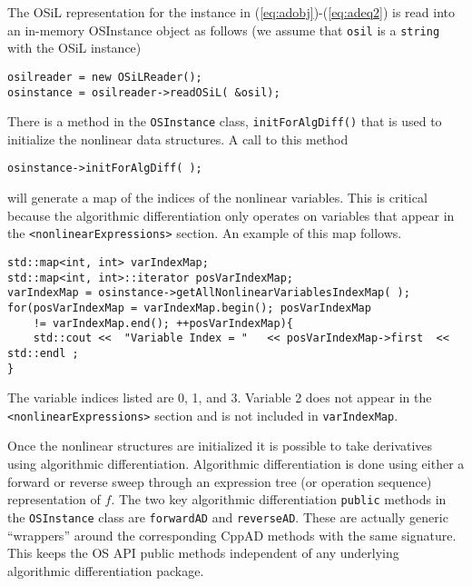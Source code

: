 \documentclass[11pt]{article}
\renewcommand{\_}{{\char"5F}}
\renewcommand{\{}{{\char"7B}}
\renewcommand{\}}{{\char"7D}}
\renewcommand{\^}{{\char"0D}}
\renewcommand{\'}{{\char"0D}}
\begin{document}
The OSiL representation for the instance  in  (\ref{eq:adobj})-(\ref{eq:adeq2})  is read into an in-memory OSInstance object as follows (we assume that {\tt osil} is a {\tt string} with the OSiL instance)
\begin{verbatim}
osilreader = new OSiLReader();
osinstance = osilreader->readOSiL( &osil);
\end{verbatim}
There is a method in the {\tt OSInstance} class, {\tt initForAlgDiff()} that is used to initialize the nonlinear data structures.  A call to this method
\begin{verbatim}
osinstance->initForAlgDiff( );
\end{verbatim}
will generate a map of the indices of the nonlinear variables. This is critical because the algorithmic differentiation only operates on variables that appear in the {\tt <nonlinearExpressions>} section.  An example of this map follows.
\begin{verbatim}
std::map<int, int> varIndexMap;
std::map<int, int>::iterator posVarIndexMap;
varIndexMap = osinstance->getAllNonlinearVariablesIndexMap( );
for(posVarIndexMap = varIndexMap.begin(); posVarIndexMap
	!= varIndexMap.end(); ++posVarIndexMap){
	std::cout <<  "Variable Index = "   << posVarIndexMap->first  << std::endl ;
}
\end{verbatim}
The variable indices listed are 0, 1, and 3. Variable 2 does not appear in the {\tt <nonlinearExpressions>} section and is not included in {\tt varIndexMap}.

Once the nonlinear structures are initialized it is possible to take derivatives using algorithmic differentiation.   Algorithmic differentiation is done using either a forward or reverse sweep through an expression tree (or operation sequence) representation of $f$.  The two key algorithmic differentiation {\tt public} methods in the {\tt OSInstance} class are {\tt forwardAD} and {\tt reverseAD}.   These are actually  generic ``wrappers'' around the corresponding CppAD methods with the same signature.  This keeps the OS API  public methods independent of any underlying algorithmic differentiation package.
\end{document}
